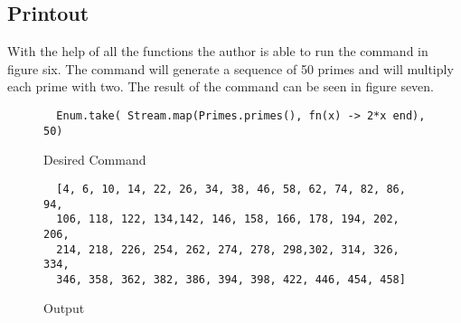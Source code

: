 \documentclass[a4paper,11pt]{article}
\begin{document}
\subsection*{Printout}
With the help of all the functions the author is able to run the command in figure six. The command will generate a sequence of 50 primes and will multiply each prime with two. The result of the command can be seen in figure seven.

\begin{figure}[H]
\begin{verbatim}
  Enum.take( Stream.map(Primes.primes(), fn(x) -> 2*x end), 50)
\end{verbatim}
\caption{Desired Command}
\label{Figure:6}
\end{figure}

\begin{figure}[H]
\begin{verbatim}
  [4, 6, 10, 14, 22, 26, 34, 38, 46, 58, 62, 74, 82, 86, 94,
  106, 118, 122, 134,142, 146, 158, 166, 178, 194, 202, 206,
  214, 218, 226, 254, 262, 274, 278, 298,302, 314, 326, 334,
  346, 358, 362, 382, 386, 394, 398, 422, 446, 454, 458]
\end{verbatim}
\caption{Output}
\label{Figure:7}
\end{figure}
\end{document}
